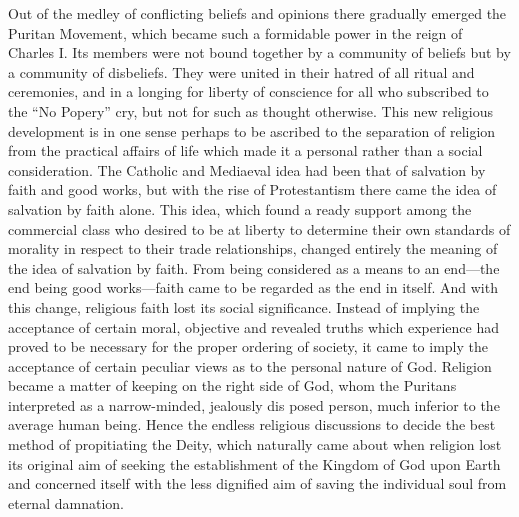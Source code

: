 \documentclass{book}
\begin{document}
Out of the medley of conflicting beliefs and opinions there gradually emerged the Puritan Movement, which became such a formidable power in the reign of Charles I. Its members were not bound together by a community of beliefs but by a community of disbeliefs. They were united in their hatred of all ritual and ceremonies, and in a longing for liberty of conscience for all who subscribed to the “No Popery” cry, but not for such as thought otherwise. This new religious development is in one sense perhaps to be ascribed to the separation of religion from the practical affairs of life which made it a personal rather than a social consideration. The Catholic and Mediaeval idea had been that of salvation by faith and good works, but with the rise of Protestantism there came the idea of salvation by faith alone. This idea, which found a ready support among the commercial class who desired to be at liberty to determine their own standards of morality in respect to their trade relationships, changed entirely the meaning of the idea of salvation by faith. From being considered as a means to an end—the end being good works—faith came to be regarded as the end in itself. And with this change, religious faith lost its social significance. Instead of implying the acceptance of certain moral, objective and revealed truths which experience had proved to be necessary for the proper ordering of society, it came to imply the acceptance of certain peculiar views as to the personal nature of God. Religion became a matter of keeping on the right side of God, whom the Puritans interpreted as a narrow-minded, jealously dis posed person, much inferior to the average human being. Hence the endless religious discussions to decide the best method of propitiating the Deity, which naturally came about when religion lost its original aim of seeking the establishment of the Kingdom of God upon Earth and concerned itself with the less dignified aim of saving the individual soul from eternal damnation.
\end{document}
